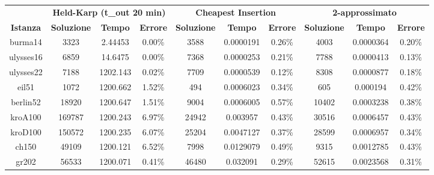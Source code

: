 \begin{longtable}{|c|c|c|c|c|c|c|c|c|c|}
\hline
\textbf{}        & \multicolumn{3}{c|}{\textbf{Held-Karp (t\_out 20 min)}}                   & \multicolumn{3}{c|}{\textbf{Cheapest Insertion}}          & \multicolumn{3}{c|}{\textbf{2-approssimato}}              \\ \cline{2-10} 
\textbf{Istanza} & \textbf{Soluzione} & \textbf{Tempo} & \textbf{Errore} & \textbf{Soluzione} & \textbf{Tempo} & \textbf{Errore} & \textbf{Soluzione} & \textbf{Tempo} & \textbf{Errore} \\ \hline
burma14      & 3323               & 2.44453            & 0.00\%          & 3588               & 0.0000191          & 0.26\%          & 4003               & 0.0000364          & 0.20\%          \\ \hline
ulysses16    & 6859               & 14.6475            & 0.00\%          & 7368               & 0.0000253          & 0.21\%          & 7788               & 0.0000413          & 0.13\%          \\ \hline
ulysses22    & 7188               & 1202.143           & 0.02\%          & 7709               & 0.0000539          & 0.12\%          & 8308               & 0.0000877          & 0.18\%          \\ \hline
eil51        & 1072               & 1200.662           & 1.52\%          & 494                & 0.0006023          & 0.34\%          & 605                & 0.000194           & 0.42\%          \\ \hline
berlin52     & 18920              & 1200.647           & 1.51\%          & 9004              & 0.0006005          & 0.57\%          & 10402              & 0.0003238          & 0.38\%          \\ \hline
kroA100      & 169787             & 1200.243           & 6.97\%          & 24942              & 0.003957           & 0.43\%          & 30516              & 0.0006457          & 0.43\%          \\ \hline
kroD100      & 150572             & 1200.235           & 6.07\%          & 25204              & 0.0047127          & 0.37\%          & 28599              & 0.0006957          & 0.34\%          \\ \hline
ch150        & 49109              & 1200.121           & 6.52\%          & 7998               & 0.0129079          & 0.49\%          & 9315               & 0.0012785          & 0.43\%          \\ \hline
gr202        & 56533              & 1200.071           & 0.41\%          & 46480              & 0.032091           & 0.29\%          & 52615              & 0.0023568          & 0.31\%          \\ \hline

\end{longtable}

